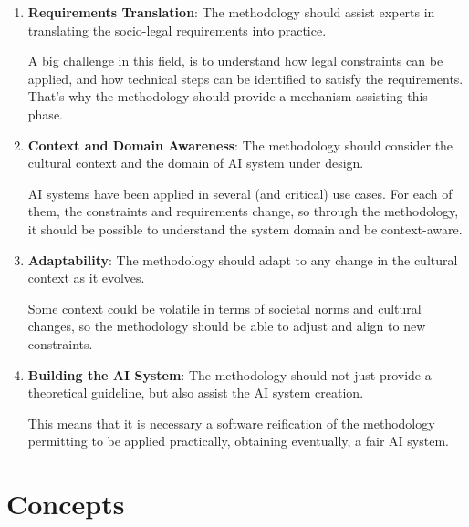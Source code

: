 \documentclass[12pt,a4paper,openright,twoside]{book}
\begin{document}
\begin{enumerate}[label=\textbf{R\arabic*}, ref=R\arabic*]
    
    \item\label{req:R1} \textbf{Requirements Translation}: The methodology should assist experts in translating the socio-legal requirements into practice.

    A big challenge in this field, is to understand how legal constraints can be applied, and how technical steps can be identified to satisfy the requirements. That's why the methodology should provide a mechanism assisting this phase.
    
    \item\label{req:R2} \textbf{Context and Domain Awareness}: The methodology should consider the cultural context and the domain of \ac{AI} system under design.
    
    AI systems have been applied in several (and critical) use cases. For each of them, the constraints and requirements change, so through the methodology, it should be possible to understand the system domain and be context-aware.

    \item\label{req:R3} \textbf{Adaptability}: The methodology should adapt to any change in the cultural context as it evolves.
    
    Some context could be volatile in terms of societal norms and cultural changes, so the methodology should be able to adjust and align to new constraints.

    \item\label{req:R4} \textbf{Building the AI System}: The methodology should not just provide a theoretical guideline, but also assist the AI system creation. 
    
    This means that it is necessary a software reification of the methodology permitting to be applied practically, obtaining eventually, a fair AI system.
\end{enumerate}


\section{Concepts}
\end{document}
